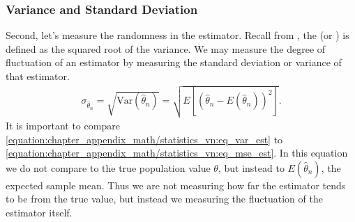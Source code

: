 \documentclass[letterpaper,11pt,english]{sphinxmanual}
\begin{document}
\subsubsection{Variance and Standard Deviation}
\label{\detokenize{chapter_appendix_math/statistics:variance-and-standard-deviation}}
Second, let’s measure the randomness in the estimator. Recall from
, the  (or ) is defined as the squared root of the variance. We may measure
the degree of fluctuation of an estimator by measuring the standard
deviation or variance of that estimator.
\begin{equation}\label{equation:chapter_appendix_math/statistics:eq_var_est}
\begin{split}\sigma_{\hat{\theta}_n} = \sqrt{\mathrm{Var} (\hat{\theta}_n )} = \sqrt{E[(\hat{\theta}_n - E(\hat{\theta}_n))^2]}.\end{split}
\end{equation}
It is important to compare \eqref{equation:chapter_appendix_math/statistics_vn:eq_var_est} to
\eqref{equation:chapter_appendix_math/statistics_vn:eq_mse_est}. In this equation we do not compare to the true
population value \(\theta\), but instead to
\(E(\hat{\theta}_n)\), the expected sample mean. Thus we are not
measuring how far the estimator tends to be from the true value, but
instead we measuring the fluctuation of the estimator itself.
\end{document}
